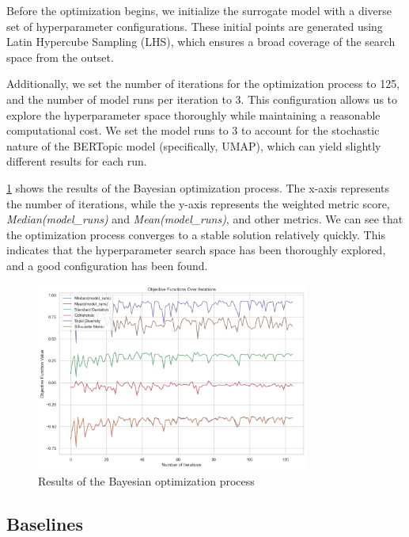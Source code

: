 Before the optimization begins, we initialize the surrogate model with a diverse set of hyperparameter configurations. These initial points are generated using Latin Hypercube Sampling (LHS), which ensures a broad coverage of the search space from the outset.

Additionally, we set the number of iterations for the optimization process to 125, and the number of model runs per iteration to 3. This configuration allows us to explore the hyperparameter space thoroughly while maintaining a reasonable computational cost. We set the model runs to 3 to account for the stochastic nature of the BERTopic model (specifically, UMAP), which can yield slightly different results for each run.

\cref{fig:bayesian_optimization} shows the results of the Bayesian optimization process. The x-axis represents the number of iterations, while the y-axis represents the weighted metric score, \textit{Median(model\_runs)} and \textit{Mean(model\_runs)}, and other metrics. We can see that the optimization process converges to a stable solution relatively quickly. This indicates that the hyperparameter search space has been thoroughly explored, and a good configuration has been found.

\begin{figure}[h]
    \centering
    \includegraphics[width=0.8\textwidth]{figures/bayesian_optimization.png}
    \caption{Results of the Bayesian optimization process}
    \label{fig:bayesian_optimization}
\end{figure}

\subsection{Baselines}
